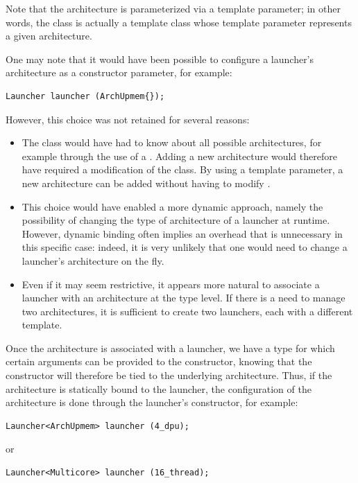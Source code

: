 Note that the architecture is parameterized via a template parameter; in other words, the  class is actually a template class 
whose template parameter  represents a given architecture. 

One may note that it would have been possible to configure a launcher’s architecture as a constructor parameter, for example:

\begin{verbatim}
Launcher launcher (ArchUpmem{});
\end{verbatim}

However, this choice was not retained for several reasons:

\begin{itemize}

\item The  class would have had to know about all possible architectures, for example through the use of a  . Adding a new architecture would therefore have required a modification of the  class.  By using a template parameter, a new architecture can be added without having to modify .

\item This choice would have enabled a more dynamic approach, namely the possibility of changing the type of architecture of a launcher at runtime. However, dynamic binding often implies an overhead that is unnecessary in this specific case: indeed, it is very unlikely that one would need to change a launcher’s architecture on the fly.

\item Even if it may seem restrictive, it appears more natural to associate a launcher with an architecture at the type level. If there is a need to manage two architectures, it is sufficient to create two launchers, each with a different template.

\end{itemize}
	
Once the architecture is associated with a launcher, we have a type for which certain arguments can be provided to the constructor, knowing that the constructor will therefore be tied to the underlying architecture. Thus, if the architecture is statically bound to the launcher, the configuration of the architecture is done through the launcher’s constructor, for example:

\begin{verbatim}
Launcher<ArchUpmem> launcher (4_dpu);
\end{verbatim}
or 
\begin{verbatim}
Launcher<Multicore> launcher (16_thread);
\end{verbatim}

